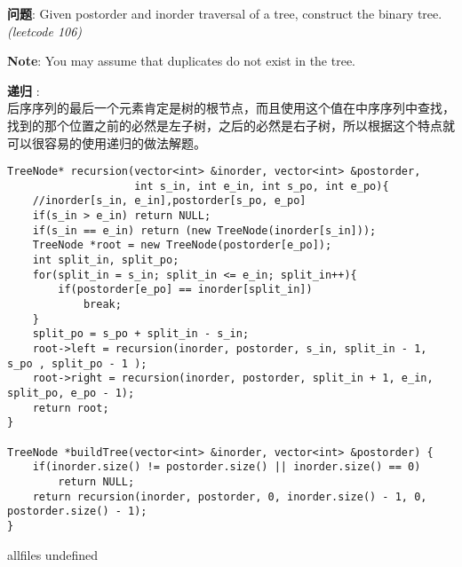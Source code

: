 \documentclass{article}
\begin{document}
\begin{CJK}{UTF8}{gbsn}     %

\else
	
\begin{description}
	\item{\textbf{问题}}: Given postorder and inorder traversal of a tree, construct the binary tree. \textit{(leetcode 106)}
	\item{\textbf{Note}}: You may assume that duplicates do not exist in the tree.
	\item{\textbf{递归}} : 
	\\后序序列的最后一个元素肯定是树的根节点，而且使用这个值在中序序列中查找，找到的那个位置之前的必然是左子树，之后的必然是右子树，所以根据这个特点就可以很容易的使用递归的做法解题。
	\begin{lstlisting}
TreeNode* recursion(vector<int> &inorder, vector<int> &postorder,
					int s_in, int e_in, int s_po, int e_po){
	//inorder[s_in, e_in],postorder[s_po, e_po]
	if(s_in > e_in)	return NULL;
	if(s_in == e_in) return (new TreeNode(inorder[s_in]));
	TreeNode *root = new TreeNode(postorder[e_po]);
	int split_in, split_po;
	for(split_in = s_in; split_in <= e_in; split_in++){
		if(postorder[e_po] == inorder[split_in])
			break;
	}
	split_po = s_po + split_in - s_in;
	root->left = recursion(inorder, postorder, s_in, split_in - 1, s_po , split_po - 1 );
	root->right = recursion(inorder, postorder, split_in + 1, e_in, split_po, e_po - 1);
	return root;
}

TreeNode *buildTree(vector<int> &inorder, vector<int> &postorder) {
	if(inorder.size() != postorder.size() || inorder.size() == 0)
		return NULL;
	return recursion(inorder, postorder, 0, inorder.size() - 1, 0, postorder.size() - 1);
}
	\end{lstlisting}
	\textit{}
\end{description}

\fi

\ifx allfiles undefined
\end{CJK}
\end{document}
